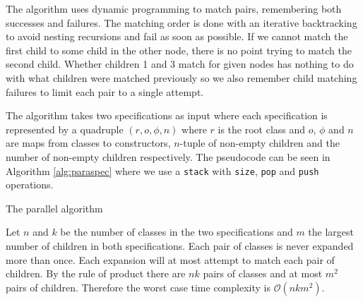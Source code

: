 The algorithm uses dynamic programming to match pairs, remembering both successes and failures. The matching order is done with an iterative backtracking to avoid nesting recursions and fail as soon as possible. If we cannot match the first child to some child in the other node, there is no point trying to match the second child. Whether children 1 and 3 match for given nodes has nothing to do with what children were matched previously so we also remember child matching failures to limit each pair to a single attempt.

The algorithm takes two specifications as input where each specification is represented by a quadruple $(r,o,\phi,n)$ where $r$ is the root class and $o$, $\phi$ and $n$ are maps from classes to constructors, $n$-tuple of non-empty children and the number of non-empty children respectively. The pseudocode can be seen in Algorithm \ref{alg:paraspec} where we use a \texttt{stack} with \texttt{size}, \texttt{pop} and \texttt{push} operations. 

\begin{algorithm}

\caption{The parallel algorithm}
\label{alg:paraspec}
\end{algorithm}

Let $n$ and $k$ be the number of classes in the two specifications and $m$ the largest number of children in both specifications. Each pair of classes is never expanded more than once. Each expansion will at most attempt to match each pair of children. By the rule of product there are $nk$ pairs of classes and at most $m^2$ pairs of children. Therefore the worst case time complexity is $\mathcal{O}(nkm^2)$.